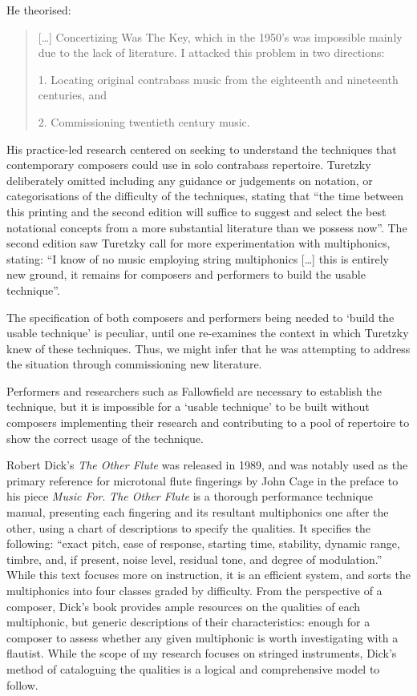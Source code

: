 He theorised: 
\begin{quote}
 […] Concertizing Was The Key, which in the 1950’s was impossible mainly due to the lack of literature. I attacked this problem in two directions: 
 
 1. Locating original contrabass music from the eighteenth and nineteenth centuries, and 
 
 2. Commissioning twentieth century music.\autocite[vii]{turetzkyContemporaryContrabass1974}
\end{quote}
His practice-led research centered on seeking to understand the techniques that contemporary composers could use in solo contrabass repertoire. 
Turetzky deliberately omitted including any guidance or judgements on notation, or categorisations of the difficulty of the techniques, stating that ``the time between this printing and the second edition will suffice to suggest and select the best notational concepts from a more substantial literature than we possess now''.\autocite[ix]{turetzkyContemporaryContrabass1974} 
The second edition saw Turetzky call for more experimentation with multiphonics, stating: ``I know of no music employing string multiphonics [\ldots] this is entirely new ground, it remains for composers and performers to build the usable technique''.\autocite[138]{turetzkyContemporaryContrabass1992}

The specification of both composers and performers being needed to ‘build the usable technique’ is peculiar, until one re-examines the context in which Turetzky knew of these techniques. 
Thus, we might infer that he was attempting to address the situation through commissioning new literature.

Performers and researchers such as Fallowfield are necessary to establish the technique, but it is impossible for a ‘usable technique’ to be built without composers implementing their research and contributing to a pool of repertoire to show the correct usage of the technique.

Robert Dick’s \emph{The Other Flute} was released in 1989, and was notably used as the primary reference for microtonal flute fingerings by John Cage in the preface to his piece \emph{Music For}.\autocite{cageMusicPartsVoice1984} 
\emph{The Other Flute} is a thorough performance technique manual, presenting each fingering and its resultant multiphonics one after the other, using a chart of descriptions to specify the qualities.\autocite[86--135]{dickOtherFlute1989} 
It specifies the following: ``exact pitch, ease of response, starting time, stability, dynamic range, timbre, and, if present, noise level, residual tone, and degree of modulation.''\autocite[84]{dickOtherFlute1989} 
While this text focuses more on instruction, it is an efficient system, and sorts the multiphonics into four classes graded by difficulty. 
From the perspective of a composer, Dick’s book provides ample resources on the qualities of each multiphonic, but generic descriptions of their characteristics: enough for a composer to assess whether any given multiphonic is worth investigating with a flautist. %
While the scope of my research focuses on stringed instruments, Dick’s method of cataloguing the qualities is a logical and comprehensive model to follow.

